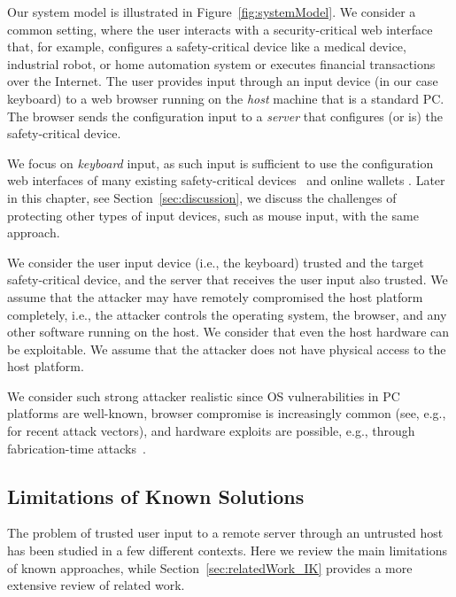 Our system model is illustrated in Figure~\ref{fig:systemModel}. We consider a common setting, where the user interacts with a security-critical web interface that, for example, configures a safety-critical device like a medical device, industrial robot, or home automation system or executes financial transactions over the Internet. The user provides input through an input device (in our case keyboard) to a web browser running on the \emph{host} machine that is a standard PC. The browser sends the configuration input to a \emph{server} that configures (or is) the safety-critical device.

We focus on \emph{keyboard} input, as such input is sufficient to use the configuration web interfaces of many existing safety-critical devices~\cite{7306669,controlbyweb,siemens,siemens2,schneider} and online wallets \cite{bitgo,bitcoinwallet,coin,blockchain,coinbase}. Later in this chapter, see Section~\ref{sec:discussion}, we discuss the challenges of protecting other types of input devices, such as mouse input, with the same approach.

 We consider the user input device (i.e., the keyboard) trusted and the target safety-critical device, and the server that receives the user input also trusted. We assume that the attacker may have remotely compromised the host platform completely, i.e., the attacker controls the operating system, the browser, and any other software running on the host. We consider that even the host hardware can be exploitable. We assume that the attacker does not have physical access to the host platform.

We consider such strong attacker realistic since OS vulnerabilities in PC platforms are well-known, browser compromise is increasingly common (see, e.g.,~\cite{provos2007ghost,dougan2012man} for recent attack vectors), and hardware exploits are possible, e.g., through fabrication-time attacks~\cite{Lin2009,a2}. 

\subsection{Limitations of Known Solutions}

The problem of trusted user input to a remote server through an untrusted host has been studied in a few different contexts. Here we review the main limitations of known approaches, while Section~\ref{sec:relatedWork_IK} provides a more extensive review of related work.


